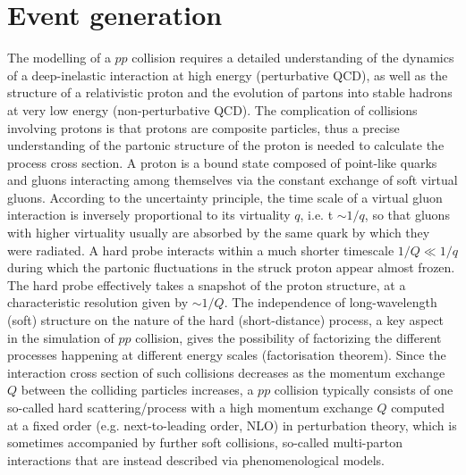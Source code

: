 \section{Event generation}
\label{chp:evtsim:evtgen}

The modelling of a $pp$ collision requires a detailed understanding of the dynamics of a deep-inelastic interaction at high energy (perturbative QCD), as well as the structure of a relativistic proton and the evolution of partons into stable hadrons at very low energy (non-perturbative QCD). The complication of collisions involving protons is that protons are composite particles, thus a precise understanding of the partonic structure of the proton is needed to calculate the process cross section. A proton is a bound state composed of point-like quarks and gluons interacting among themselves via the constant exchange of soft virtual gluons. According to the uncertainty principle, the time scale of a virtual gluon interaction is inversely proportional to its virtuality $q$, i.e. t $\sim1/q$, so that gluons with higher virtuality usually are absorbed by the same quark by which they were radiated. A hard probe interacts within a much shorter timescale $1/Q \ll 1/q$ during which the partonic fluctuations in the struck proton appear almost frozen. The hard probe effectively takes a snapshot of the proton structure, at a characteristic resolution given by $\sim1/Q$. The independence of long-wavelength (soft) structure on the nature of the hard (short-distance) process, a key aspect in the simulation of $pp$ collision, gives the possibility of factorizing the different processes happening at different energy scales (factorisation theorem).
Since the interaction cross section of such collisions decreases as the momentum exchange $Q$ between the colliding particles increases, a $pp$ collision typically consists of one so-called hard scattering/process with a high momentum exchange $Q$ computed at a fixed order (e.g. next-to-leading order, NLO) in perturbation theory, which is sometimes accompanied by further soft collisions, so-called multi-parton interactions that are instead described via phenomenological models.


